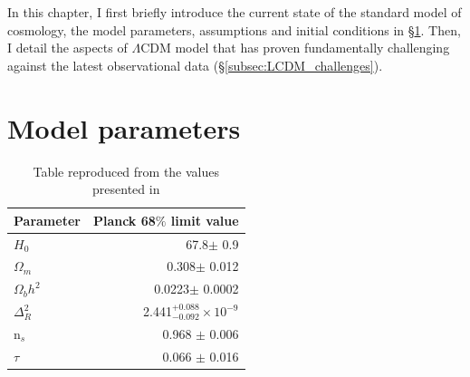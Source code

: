 \documentclass[a4wide,12pt]{book}
\begin{document}

In this chapter, I first briefly introduce the current state of the standard model of cosmology, the model parameters, assumptions and initial conditions in  \S \ref{subsec:Model_parameters}. Then, I detail the aspects of $\Lambda$CDM model that has proven fundamentally challenging against the latest observational data (\S \ref{subsec:LCDM_challenges}).

\section{Model parameters}
\label{subsec:Model_parameters}

\begin{table}
\begin{tabular}{l{}r}
Parameter & Planck 68$\%$ limit value \\
\hline
$H_0$ & 67.8$\pm$ 0.9 \\
$\Omega_m$ & 0.308$\pm$ 0.012 \\
$\Omega_b h^2$ & 0.0223$\pm$ 0.0002 \\
$\Delta^2_R$ & 2.441$^{+0.088}_{-0.092} \times 10^{-9}$ \\
n$_s$ & 0.968 $\pm$ 0.006\\
$\tau$ & 0.066 $\pm$ 0.016\\
\end{tabular}
\caption[Table caption text]{Table reproduced from the values presented in \citet[][]{Planck2015}}
\label{tab:LCDM_Planck15}
\end{table}
\end{document}
